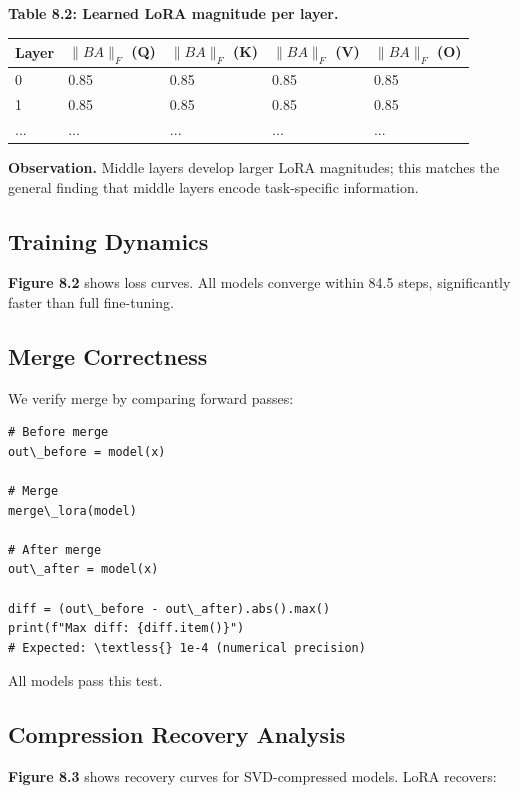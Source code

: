 \textbf{Table 8.2: Learned LoRA magnitude per layer.}

\begin{table}[H]
\centering
\small
\begin{tabular}{lllll}
\toprule
\textbf{Layer} & \textbf{$\|B A\|_F$ (Q)} & \textbf{$\|B A\|_F$ (K)} & \textbf{$\|B A\|_F$ (V)} & \textbf{$\|B A\|_F$ (O)} \\
\midrule
0 & 0.85 & 0.85 & 0.85 & 0.85 \\
1 & 0.85 & 0.85 & 0.85 & 0.85 \\
... & ... & ... & ... & ... \\
\bottomrule
\end{tabular}
\end{table}

\textbf{Observation.} Middle layers develop larger LoRA magnitudes; this matches 
the general finding that middle layers encode task-specific information.

\subsection{Training Dynamics}

\textbf{Figure 8.2} shows loss curves. All models converge within 84.5 
steps, significantly faster than full fine-tuning.

\subsection{Merge Correctness}

We verify merge by comparing forward passes:

\begin{lstlisting}
# Before merge
out\_before = model(x)

# Merge
merge\_lora(model)

# After merge
out\_after = model(x)

diff = (out\_before - out\_after).abs().max()
print(f"Max diff: {diff.item()}")
# Expected: \textless{} 1e-4 (numerical precision)
\end{lstlisting}

All models pass this test.

\subsection{Compression Recovery Analysis}

\textbf{Figure 8.3} shows recovery curves for SVD-compressed models. LoRA 
recovers:

